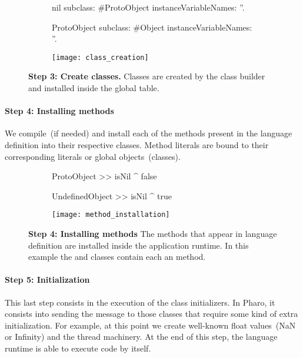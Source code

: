 \begin{figure}[ht]
\begin{subfigure}{.4\linewidth}
\begin{code}
nil subclass: #ProtoObject
    instanceVariableNames: ''.

ProtoObject
    subclass: #Object
    instanceVariableNames: ''.
\end{code}
\end{subfigure}
\begin{subfigure}{.6\linewidth}
\texttt{[image: class\_creation]}
\end{subfigure}
\caption{\textbf{Step 3: Create classes.} Classes are created by the class builder and installed inside the global table. \label{fig:class_creation}}
\end{figure}

\paragraph{\textbf{Step 4: Installing methods}}

We compile~(if needed) and install each of the methods present in the language definition into their respective classes. Method literals are bound to their corresponding literals or global objects~(\eg classes).

\begin{figure}[ht]
\begin{subfigure}{.4\linewidth}
\begin{code}
ProtoObject >> isNil
   ^ false

UndefinedObject >> isNil
   ^ true
\end{code}
\end{subfigure}
\begin{subfigure}{.6\linewidth}
\texttt{[image: method\_installation]}
\end{subfigure}
\caption{\textbf{Step 4: Installing methods} The methods that appear in language definition are installed inside the application runtime. In this example the  and  classes contain each an  method.\label{fig:method_installation}}
\end{figure}


\paragraph{\textbf{Step 5: Initialization}}
This last step consists in the execution of the class initializers. In Pharo, it consists into sending the message  to those classes that require some kind of extra initialization. For example, at this point we create well-known float values~(\eg NaN or Infinity) and the thread machinery. At the end of this step, the language runtime is able to execute code by itself.

